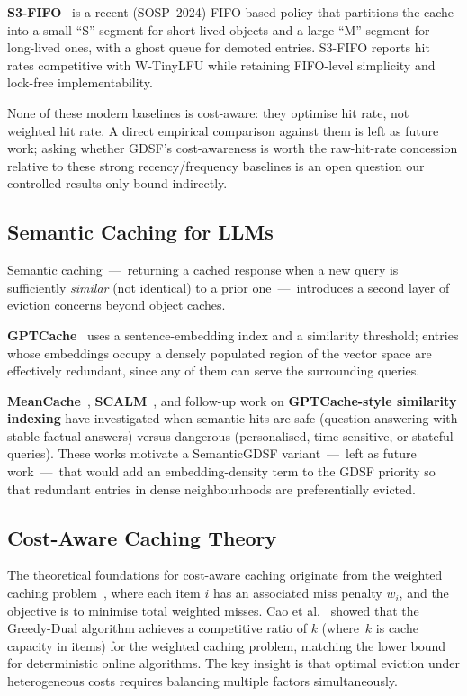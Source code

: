 \documentclass[sigconf, nonacm, review=false, screen=true]{acmart}
\begin{document}
\textbf{S3-FIFO}~\cite{yang2024sosp} is a recent (SOSP~2024) FIFO-based
policy that partitions the cache into a small ``S'' segment for
short-lived objects and a large ``M'' segment for long-lived ones, with
a ghost queue for demoted entries. S3-FIFO reports hit rates competitive
with W-TinyLFU while retaining FIFO-level simplicity and lock-free
implementability.

None of these modern baselines is cost-aware: they optimise hit rate,
not weighted hit rate. A direct empirical comparison against them is
left as future work; asking whether GDSF's cost-awareness is worth the
raw-hit-rate concession relative to these strong recency/frequency
baselines is an open question our controlled results only bound
indirectly.

\subsection{Semantic Caching for LLMs}
Semantic caching~---~returning a cached response when a new query is
sufficiently \emph{similar} (not identical) to a prior one~---~introduces
a second layer of eviction concerns beyond object caches.

\textbf{GPTCache}~\cite{gptcache} uses a sentence-embedding index and a
similarity threshold; entries whose embeddings occupy a densely populated
region of the vector space are effectively redundant, since any of them
can serve the surrounding queries.

\textbf{MeanCache}~\cite{meancache}, \textbf{SCALM}~\cite{scalm}, and
follow-up work on \textbf{GPTCache-style similarity indexing} have
investigated when semantic hits are safe (question-answering with stable
factual answers) versus dangerous (personalised, time-sensitive, or
stateful queries). These works motivate a SemanticGDSF variant~---~left
as future work~---~that would add an embedding-density term to the
GDSF priority so that redundant entries in dense neighbourhoods are
preferentially evicted.

\subsection{Cost-Aware Caching Theory}
The theoretical foundations for cost-aware caching originate from the
weighted caching problem~\cite{young2002onlinefilecaching}, where each
item $i$ has an associated miss penalty $w_i$, and the objective is to
minimise total weighted misses. Cao et al.~\cite{cao1997costaware} showed
that the Greedy-Dual algorithm achieves a competitive ratio of $k$
(where~$k$ is cache capacity in items) for the weighted caching problem,
matching the lower bound for deterministic online algorithms. The key
insight is that optimal eviction under heterogeneous costs requires
balancing multiple factors simultaneously.
\end{document}
